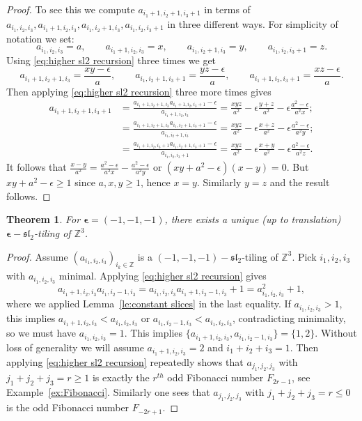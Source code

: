 \documentclass{amsart}
\newtheorem{theorem}{Theorem}
\newcommand{\bepsilon}{\boldsymbol{\epsilon}}
\newcommand{\fsl}{\mathfrak{sl}}
\newcommand{\ZZ}{\mathbb{Z}}
\begin{document}
    \begin{proof}
      To see this we compute $a_{i_1+1,i_2+1,i_3+1}$ in terms of $a_{i_1,i_2,i_3}, a_{i_1+1,i_2,i_3}, a_{i_1,i_2+1,i_3}, a_{i_1,i_2,i_3+1}$ in three different ways.  For simplicity of notation we set:
      \[a_{i_1,i_2,i_3}=a,\quad\quad a_{i_1+1,i_2,i_3}=x,\quad\quad a_{i_1,i_2+1,i_3}=y,\quad\quad a_{i_1,i_2,i_3+1}=z.\]
      Using \eqref{eq:higher sl2 recursion} three times we get
      \[a_{i_1+1,i_2+1,i_3}=\frac{xy-\epsilon}{a},\quad\quad a_{i_1,i_2+1,i_3+1}=\frac{yz-\epsilon}{a},\quad\quad a_{i_1+1,i_2,i_3+1}=\frac{xz-\epsilon}{a}.\]
      Then applying \eqref{eq:higher sl2 recursion} three more times gives
      \begin{align*}
        a_{i_1+1,i_2+1,i_3+1} 
        &= \frac{a_{i_1+1,i_2+1,i_3}a_{i_1+1,i_2,i_3+1}-\epsilon}{a_{i_1+1,i_2,i_3}}=\frac{xyz}{a^2}-\epsilon\frac{y+z}{a^2}-\epsilon\frac{a^2-\epsilon}{a^2x};\\
        &= \frac{a_{i_1+1,i_2+1,i_3}a_{i_1,i_2+1,i_3+1}-\epsilon}{a_{i_1,i_2+1,i_3}}=\frac{xyz}{a^2}-\epsilon\frac{x+z}{a^2}-\epsilon\frac{a^2-\epsilon}{a^2y};\\
        &= \frac{a_{i_1+1,i_2,i_3+1}a_{i_1,i_2+1,i_3+1}-\epsilon}{a_{i_1,i_2,i_3+1}}=\frac{xyz}{a^2}-\epsilon\frac{x+y}{a^2}-\epsilon\frac{a^2-\epsilon}{a^2z}.
      \end{align*}
      It follows that $\frac{x-y}{a^2}=\frac{a^2-\epsilon}{a^2x}-\frac{a^2-\epsilon}{a^2y}$ or $(xy+a^2-\epsilon)(x-y)=0$.  But $xy+a^2-\epsilon\ge1$ since $a,x,y\ge1$, hence $x=y$.  Similarly $y=z$ and the result follows.
    \end{proof}

    \begin{theorem}
      For $\bepsilon=(-1,-1,-1)$, there exists a unique (up to translation) $\bepsilon-\fsl_2$-tiling of $\ZZ^3$.
    \end{theorem}
    \begin{proof}
      Assume $(a_{i_1,i_2,i_3})_{i_k\in\ZZ}$ is a $(-1,-1,-1)-\fsl_2$-tiling of $\ZZ^3$.  Pick $i_1,i_2,i_3$ with $a_{i_1,i_2,i_3}$ minimal.  Applying \eqref{eq:higher sl2 recursion} gives
      \[a_{i_1+1,i_2,i_3}a_{i_1,i_2-1,i_3}=a_{i_1,i_2,i_3}a_{i_1+1,i_2-1,i_3}+1=a_{i_1,i_2,i_3}^2+1,\]
      where we applied Lemma~\ref{le:constant slices} in the last equality.  If $a_{i_1,i_2,i_3}>1$, this implies $a_{i_1+1,i_2,i_3}<a_{i_1,i_2,i_3}$ or $a_{i_1,i_2-1,i_3}<a_{i_1,i_2,i_3}$, contradicting minimality, so we must have $a_{i_1,i_2,i_3}=1$.  This implies $\{a_{i_1+1,i_2,i_3},a_{i_1,i_2-1,i_3}\}=\{1,2\}$.  Without loss of generality we will assume $a_{i_1+1,i_2,i_3}=2$ and $i_1+i_2+i_3=1$.  Then applying \eqref{eq:higher sl2 recursion} repeatedly shows that $a_{j_1,j_2,j_3}$ with $j_1+j_2+j_3=r\ge1$ is exactly the $r^{th}$ odd Fibonacci number $F_{2r-1}$, see Example~\ref{ex:Fibonacci}.  Similarly one sees that $a_{j_1,j_2,j_3}$ with $j_1+j_2+j_3=r\le0$ is the odd Fibonacci number $F_{-2r+1}$.
    \end{proof}
\end{document}
